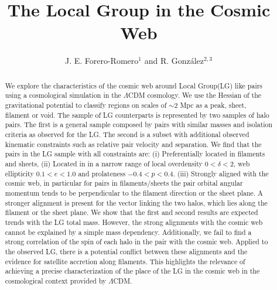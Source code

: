 \documentclass{emulateapj}
\begin{document}

\title{The Local Group in the Cosmic Web}
\author{J. E. Forero-Romero$^1$ and R. Gonz\'alez$^{2,3}$}

\begin{abstract}
We explore the characteristics of the
cosmic web around Local Group(LG) like pairs  using a cosmological simulation in the
$\Lambda$CDM cosmology.  
We use the Hessian of the gravitational potential to classify regions
on scales of $\sim 2$ Mpc as a peak, sheet, filament or void.  
The sample of LG counterparts is represented by two samples of halo
pairs. 
The first is a general sample composed by pairs with
similar masses and isolation criteria as observed for the LG.  
The second is a subset with additional observed kinematic constraints 
such as relative pair velocity and separation. 
We find that the pairs in the LG sample with all constraints are: (i)
Preferentially   located in filaments and sheets, (ii) Located in in a
narrow range of local overdensity $0<\delta<2$, web ellipticity $0.1<e<1.0$ and
prolateness $-0.4<p<0.4$.  (iii) Strongly aligned with the cosmic web,
in particular for pairs in filaments/sheets the pair orbital angular
momentum tends to be perpendicular to the filament direction or the
sheet plane.
A stronger alignment is present for the vector linking the two halos,
which lies along the filament or the sheet plane.  
We show that the first and second results are expected trends with the LG
total mass. 
However, the strong alignments with the cosmic web cannot be explained
by a simple mass dependency. 
Additionally, we fail to find a strong correlation of the spin of each
halo in the pair with the cosmic web.
Applied to the observed LG, there is a potential conflict between
these alignments and the evidence for satellite accretion along
filaments. 
This highlights the relevance of achieving a precise characterization
of the place of the LG in the cosmic web in the cosmological context
provided by $\Lambda$CDM.


\end{abstract}
\end{document}
